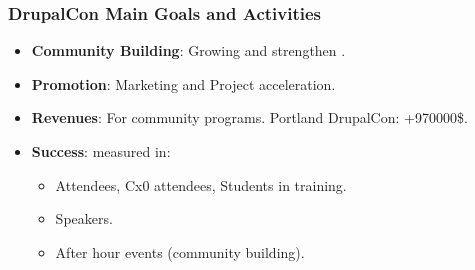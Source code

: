 \begin{frame}[allowframebreaks]
\frametitle{DrupalCon Main Goals and Activities}

\begin{itemize}
\item \textbf{Community Building}: Growing and strengthen .
\item \textbf{Promotion}: Marketing and Project acceleration.
\item \textbf{Revenues}: For community programs. Portland DrupalCon: +970000\$.
\item \textbf{Success}:  measured in:
\begin{itemize}
\item Attendees, Cx0 attendees, Students in training.
\item Speakers.
\item After hour events (community building).
\end{itemize}
\end{itemize}

\end{frame}
